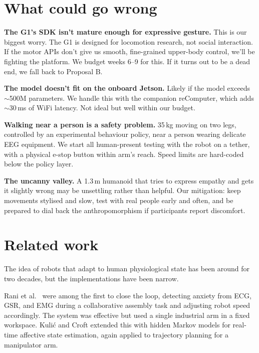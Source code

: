 \documentclass[11pt,a4paper]{article}
\begin{document}
\section{What could go wrong}

\textbf{The G1's SDK isn't mature enough for expressive gesture.} This is our biggest worry. The G1 is designed for locomotion research, not social interaction. If the motor APIs don't give us smooth, fine-grained upper-body control, we'll be fighting the platform. We budget weeks 6--9 for this. If it turns out to be a dead end, we fall back to Proposal B.

\textbf{The model doesn't fit on the onboard Jetson.} Likely if the model exceeds $\sim$500M parameters. We handle this with the companion reComputer, which adds $\sim$30\,ms of WiFi latency. Not ideal but well within our budget.

\textbf{Walking near a person is a safety problem.} 35\,kg moving on two legs, controlled by an experimental behaviour policy, near a person wearing delicate EEG equipment. We start all human-present testing with the robot on a tether, with a physical e-stop button within arm's reach. Speed limits are hard-coded below the policy layer.

\textbf{The uncanny valley.} A 1.3\,m humanoid that tries to express empathy and gets it slightly wrong may be unsettling rather than helpful. Our mitigation: keep movements stylised and slow, test with real people early and often, and be prepared to dial back the anthropomorphism if participants report discomfort.

\section{Related work}

The idea of robots that adapt to human physiological state has been around for two decades, but the implementations have been narrow.

Rani et al.\ \cite{rani2004} were among the first to close the loop, detecting anxiety from ECG, GSR, and EMG during a collaborative assembly task and adjusting robot speed accordingly. The system was effective but used a single industrial arm in a fixed workspace. Kuli\'{c} and Croft \cite{kulic2007} extended this with hidden Markov models for real-time affective state estimation, again applied to trajectory planning for a manipulator arm.
\end{document}
